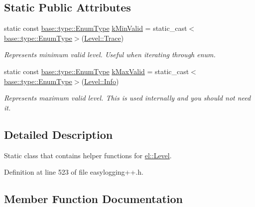 \subsection*{Static Public Attributes}
\begin{DoxyCompactItemize}
\item 
static const \hyperlink{namespaceel_1_1base_1_1type_afb892a99b7545bf6e45c1e1d84af2ec9}{base\+::type\+::\+Enum\+Type} \hyperlink{classel_1_1_level_helper_a3ecfe43d5b242e9946bad7f61ea4d89d}{k\+Min\+Valid} = static\+\_\+cast$<$\hyperlink{namespaceel_1_1base_1_1type_afb892a99b7545bf6e45c1e1d84af2ec9}{base\+::type\+::\+Enum\+Type}$>$(\hyperlink{namespaceel_ab0ac6091262344c52dd2d3ad099e8e36add4ec0ac4e58f7c32a01244ae91150b1}{Level\+::\+Trace})
\begin{DoxyCompactList}\small\item\em Represents minimum valid level. Useful when iterating through enum. \end{DoxyCompactList}\item 
static const \hyperlink{namespaceel_1_1base_1_1type_afb892a99b7545bf6e45c1e1d84af2ec9}{base\+::type\+::\+Enum\+Type} \hyperlink{classel_1_1_level_helper_aa06e80c65db5c336c4aad25872cf9a48}{k\+Max\+Valid} = static\+\_\+cast$<$\hyperlink{namespaceel_1_1base_1_1type_afb892a99b7545bf6e45c1e1d84af2ec9}{base\+::type\+::\+Enum\+Type}$>$(\hyperlink{namespaceel_ab0ac6091262344c52dd2d3ad099e8e36a4059b0251f66a18cb56f544728796875}{Level\+::\+Info})
\begin{DoxyCompactList}\small\item\em Represents maximum valid level. This is used internally and you should not need it. \end{DoxyCompactList}\end{DoxyCompactItemize}


\subsection{Detailed Description}
Static class that contains helper functions for \hyperlink{namespaceel_ab0ac6091262344c52dd2d3ad099e8e36}{el\+::\+Level}. 

Definition at line 523 of file easylogging++.\+h.



\subsection{Member Function Documentation}
\hypertarget{classel_1_1_level_helper_a1279f27df29a003df5ecc3d0bf4dacbb}{}
